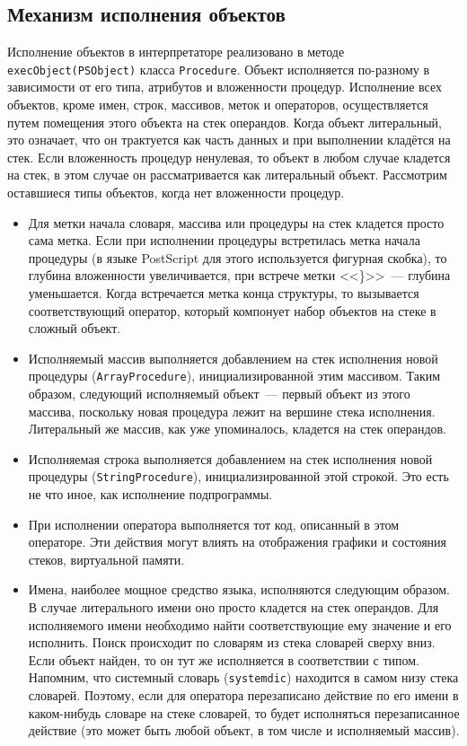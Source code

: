 \subsection{Механизм исполнения объектов}
Исполнение объектов в интерпретаторе реализовано в методе  \texttt{execObject(PSObject)} класса \texttt{Procedure}. Объект исполняется по-разному в зависимости от его типа, атрибутов и вложенности процедур. Исполнение всех объектов, кроме имен, строк, массивов, меток и операторов, осуществляется путем помещения этого объекта на стек операндов. Когда объект литеральный, это означает, что он трактуется как часть данных и при выполнении кладётся на стек. Если вложенность процедур ненулевая, то объект в любом случае кладется на стек, в этом случае он рассматривается как литеральный объект. Рассмотрим оставшиеся типы объектов, когда нет вложенности процедур.
\begin{itemize}
\item  Для метки начала словаря, массива или процедуры на стек кладется просто сама метка.
Если при исполнении процедуры встретилась метка начала процедуры (в языке PostScript для этого используется фигурная скобка), то глубина вложенности увеличивается, при встрече метки <<\}>>~--- глубина уменьшается. Когда встречается метка конца структуры, то вызывается соответствующий оператор, который компонует набор объектов на стеке в сложный объект.

\item Исполняемый массив выполняется добавлением на стек исполнения новой процедуры (\texttt{ArrayProcedure}), инициализированной этим массивом. Таким образом, следующий исполняемый объект~--- первый объект из этого массива, поскольку новая процедура лежит на вершине стека исполнения. Литеральный же массив, как уже упоминалось, кладется на стек операндов.

\item Исполняемая строка выполняется добавлением на стек исполнения новой процедуры (\texttt{StringProcedure}), инициализированной этой строкой. Это есть не что иное, как исполнение подпрограммы.

\item При исполнении оператора выполняется тот код, описанный в этом операторе. Эти действия могут  влиять на отображения графики и состояния стеков, виртуальной памяти.

\item Имена, наиболее мощное средство языка, исполняются следующим образом. В случае литерального имени оно просто кладется на стек операндов. Для исполняемого имени необходимо найти соответствующие ему значение и его исполнить. Поиск происходит по словарям из стека словарей сверху вниз. Если объект найден, то он тут же исполняется в соответствии с типом. Напомним, что системный словарь (\texttt{systemdic}) находится в самом низу стека словарей. Поэтому, если для  оператора перезаписано действие по его имени в каком-нибудь словаре на стеке словарей, то будет исполняться перезаписанное действие (это может быть любой объект, в том числе и исполняемый массив).
\end{itemize}


